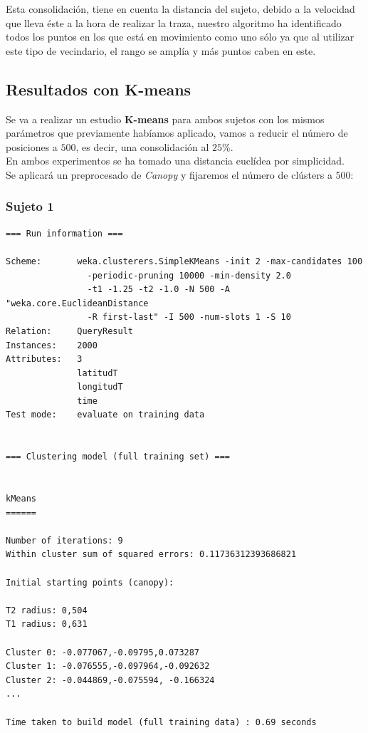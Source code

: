 \documentclass[a4paper, 12pt]{article}
\begin{document}
Esta consolidaci\'on, tiene en cuenta la distancia del sujeto, debido a la velocidad que lleva \'este a la hora de realizar la traza, nuestro algoritmo ha identificado todos los puntos en los que est\'a en movimiento como uno s\'olo ya que al utilizar este tipo de vecindario, el rango se ampl\'ia y m\'as puntos caben en este.\\

\pagebreak
\subsection{Resultados con K-means}

Se va a realizar un estudio \textbf{K-means} para ambos sujetos con los mismos par\'ametros que previamente hab\'iamos aplicado, vamos a reducir el n\'umero de posiciones a $500$, es decir, una consolidaci\'on al $25\%$. \\

En ambos experimentos se ha tomado una distancia eucl\'idea por simplicidad.\\

Se aplicar\'a un preprocesado de \textit{Canopy} y fijaremos el n\'umero de cl\'usters a $500$: \\

\subsubsection{Sujeto 1}

\begin{verbatim}
=== Run information ===

Scheme:       weka.clusterers.SimpleKMeans -init 2 -max-candidates 100 
				-periodic-pruning 10000 -min-density 2.0 
				-t1 -1.25 -t2 -1.0 -N 500 -A "weka.core.EuclideanDistance 
				-R first-last" -I 500 -num-slots 1 -S 10
Relation:     QueryResult
Instances:    2000
Attributes:   3
              latitudT
              longitudT
              time
Test mode:    evaluate on training data


=== Clustering model (full training set) ===


kMeans
======

Number of iterations: 9
Within cluster sum of squared errors: 0.11736312393686821

Initial starting points (canopy):

T2 radius: 0,504     
T1 radius: 0,631  

Cluster 0: -0.077067,-0.09795,0.073287
Cluster 1: -0.076555,-0.097964,-0.092632
Cluster 2: -0.044869,-0.075594, -0.166324
...

Time taken to build model (full training data) : 0.69 seconds
\end{verbatim}
\end{document}
